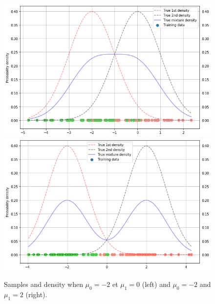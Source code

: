 \documentclass[a4paper,10pt,fleqn]{article}
\newcommand{\1}{\ensuremath{\mathbbm{1}}}
\begin{document}
\begin{figure}[h!]
\begin{center}
\includegraphics[scale=0.3]{mu0_mum2.png}
\includegraphics[scale=0.3]{mu2_mum2.png}
\caption{Samples and density when   $\mu_0 = -2$ et $\mu_1 = 0$ (left) and $\mu_0 = -2$ and $\mu_1 = 2$ (right).}
\end{center}
\end{figure}
\end{document}
